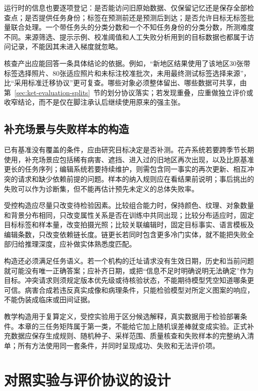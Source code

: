 运行时的信息也要逐项登记：是否能访问旧原始数据、仅保留记忆还是保存全部检查点；是否提供任务身份；标签在预测前还是预测后到达；是否允许目标无标签批量联合处理。一个带任务头的分类分数和一个不知任务身份的分类分数，所测难度不同。来源筛选、提示示例、校准阈值和人工失败分析用到的目标数据也都属于访问记录，不能因其未进入梯度就忽略。

核查产出应能回答一条具体结论的依据。例如，“新地区结果使用了该地区30张带标签选择照片、80张适应照片和未标注校准批次，未用最终测试标签选择来源”，比“采用标准迁移协议”更可复查。哪些对象必须整体留出、哪些数据可共享，由第~\ref{sec:ket-evaluation-splits}~节的划分协议落实；若发现重叠，应重做独立评价或收窄结论，而不是仅在脚注承认后继续使用原来的强主张。

\subsection{补充场景与失败样本的构造}
\label{sec:ket-evaluation-stress}

已有基准没有覆盖的条件，应由研究目标决定是否补测。花卉系统若要跨季节长期使用，补充场景应包括稀有病害、遮挡、进入过的旧地区再次出现，以及比原基准更长的任务序列；编辑系统若要持续维护，则需包含同一事实的再次更新、相互冲突的请求和缺少依赖前提的问题。样本的纳入规则应在看结果前说明；事后挑出的失败可以作为诊断集，但不能再估计预先未定义的总体失败率。

受控构造应尽量只改变待检验因素。比较组合能力时，保持颜色、纹理、对象数量和背景分布相同，只改变属性关系是否在训练中共同出现；比较分布适应时，固定目标标签和样本量，改变拍摄光照；比较关联编辑时，固定目标事实、语言模板及编辑条数，只改变依赖链长度。链更长若同时包含更多冷门实体，就不能把失败全部归给推理深度，应补做实体熟悉度匹配。

构造还必须满足任务语义。若一个机构的迁址请求没有生效日期，历史和当前问题就可能没有唯一正确答案；应补齐日期，或把“信息不足时明确说明无法确定”作为目标。冲突请求则须规定版本优先级或待核验状态，不能期待模型凭空知道哪条更可信。病害合成若违反真实成像和病理条件，只能检验模型对所定义图案的响应，不能伪装成临床或田间证据。

教学构造用于复算定义，受控实验用于区分候选解释，真实数据用于检验部署条件。本章的三任务矩阵属于第一类，不能给它加上随机误差棒就变成实验。正式补充数据应保存生成规则、随机种子、采样范围、质量核查和失败样本的完整纳入清单；所有方法使用同一套条件，并同时呈现成功、失败和无法评价项。

\section{对照实验与评价协议的设计}
\label{sec:ket-evaluation-protocol}

